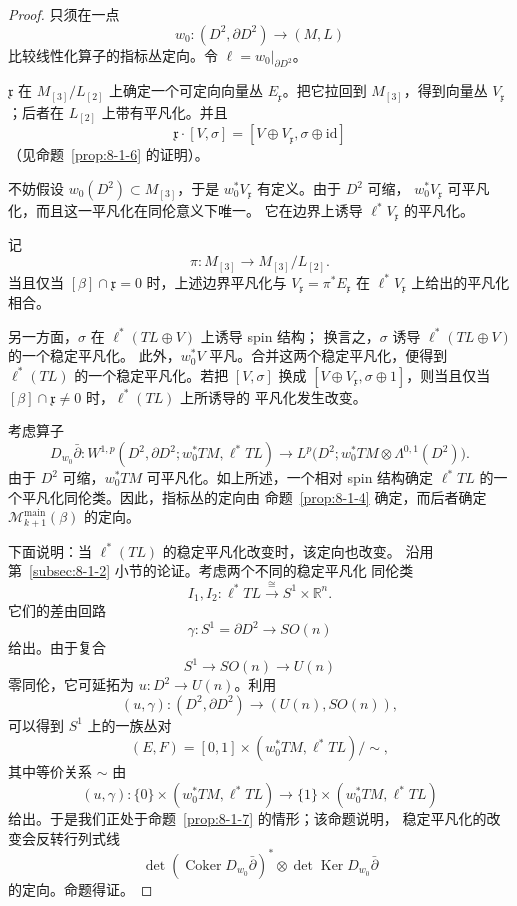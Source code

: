 \begin{proof}
只须在一点
\[
 w_0\colon(D^2,\partial D^2)\longrightarrow(M,L)
\]
比较线性化算子的指标丛定向。令
$\ell=w_0|_{\partial D^2}$。

$\mathfrak x$ 在 $M_{[3]}/L_{[2]}$ 上确定一个可定向向量丛
$E_{\mathfrak x}$。把它拉回到 $M_{[3]}$，得到向量丛
$V_{\mathfrak x}$；后者在 $L_{[2]}$ 上带有平凡化。并且
\[
 \mathfrak x\cdot[V,\sigma]
 =[V\oplus V_{\mathfrak x},\sigma\oplus\mathrm{id}]
\]
（见命题~\ref{prop:8-1-6} 的证明）。

不妨假设 $w_0(D^2)\subset M_{[3]}$，于是
$w_0^*V_{\mathfrak x}$ 有定义。由于 $D^2$ 可缩，
$w_0^*V_{\mathfrak x}$ 可平凡化，而且这一平凡化在同伦意义下唯一。
它在边界上诱导 $\ell^*V_{\mathfrak x}$ 的平凡化。

记
\[
 \pi\colon M_{[3]}\longrightarrow M_{[3]}/L_{[2]}.
\]
当且仅当 $[\beta]\cap\mathfrak x=0$ 时，上述边界平凡化与
$V_{\mathfrak x}=\pi^*E_{\mathfrak x}$ 在
$\ell^*V_{\mathfrak x}$ 上给出的平凡化相合。

另一方面，$\sigma$ 在 $\ell^*(TL\oplus V)$ 上诱导 spin 结构；
换言之，$\sigma$ 诱导 $\ell^*(TL\oplus V)$ 的一个稳定平凡化。
此外，$w_0^*V$ 平凡。合并这两个稳定平凡化，便得到
$\ell^*(TL)$ 的一个稳定平凡化。若把 $[V,\sigma]$ 换成
$[V\oplus V_{\mathfrak x},\sigma\oplus1]$，则当且仅当
$[\beta]\cap\mathfrak x\neq0$ 时，$\ell^*(TL)$ 上所诱导的
平凡化发生改变。

考虑算子
\[
 D_{w_0}\bar\partial\colon
 W^{1,p}(D^2,\partial D^2;w_0^*TM,\ell^*TL)
 \longrightarrow
 L^p\bigl(D^2;w_0^*TM\otimes\Lambda^{0,1}(D^2)\bigr).
\]
由于 $D^2$ 可缩，$w_0^*TM$ 可平凡化。如上所述，一个相对 spin
结构确定 $\ell^*TL$ 的一个平凡化同伦类。因此，指标丛的定向由
命题~\ref{prop:8-1-4} 确定，而后者确定
$\mathcal M^{\mathrm{main}}_{k+1}(\beta)$ 的定向。

下面说明：当 $\ell^*(TL)$ 的稳定平凡化改变时，该定向也改变。
沿用第~\ref{subsec:8-1-2} 小节的论证。考虑两个不同的稳定平凡化
同伦类
\[
 I_1,I_2\colon\ell^*TL\xrightarrow{\ \cong\ }S^1\times\mathbb R^n.
\]
它们的差由回路
\[
 \gamma\colon S^1=\partial D^2\longrightarrow SO(n)
\]
给出。由于复合
\[
 S^1\longrightarrow SO(n)\longrightarrow U(n)
\]
零同伦，它可延拓为 $u\colon D^2\to U(n)$。利用%
\[
 (u,\gamma)\colon(D^2,\partial D^2)
 \longrightarrow(U(n),SO(n)),
\]
可以得到 $S^1$ 上的一族丛对
\[
 (E,F)=[0,1]\times(w_0^*TM,\ell^*TL)/{\sim},
\]
其中等价关系 $\sim$ 由
\[
 (u,\gamma)\colon
 \{0\}\times(w_0^*TM,\ell^*TL)
 \longrightarrow
 \{1\}\times(w_0^*TM,\ell^*TL)
\]
给出。于是我们正处于命题~\ref{prop:8-1-7} 的情形；该命题说明，
稳定平凡化的改变会反转行列式线
\[
 \det(\operatorname{Coker}D_{w_0}\bar\partial)^*
 \otimes\det\operatorname{Ker}D_{w_0}\bar\partial
\]
的定向。命题得证。
\end{proof}
